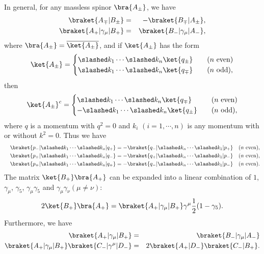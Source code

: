 In general, for any massless spinor $\bra{A_\pm}$, we have 
\begin{eqnarray}
\braket{A_\mp|B_\pm}&=&-\braket{B_\mp|A_\pm},\nonumber\\
\braket{A_+|\gamma_\mu|B_+}&=&\braket{B_-|\gamma_\mu|A_-},
\end{eqnarray}
where $\bra{A_\pm}=\overline{\ket{A_\pm}}$, and if $\ket{A_\pm}$ has the form
\begin{equation}
\ket{A_\pm}=
\begin{cases}
\slashed k_1\cdots\slashed k_n\ket{q_\pm}&\quad (n\text{ even})\\
\slashed k_1\cdots\slashed k_n\ket{q_\mp}&\quad (n\text{ odd}),
\end{cases}
\end{equation}
then
\begin{equation}
\ket{A_\pm}^c=
\begin{cases}
\slashed k_1\cdots\slashed k_n\ket{q_\mp}&\quad (n\text{ even})\\
-\slashed k_1\cdots\slashed k_n\ket{q_\pm}&\quad (n\text{ odd}),
\end{cases}
\end{equation}
where $q$ is a momentum with $q^2=0$ and $k_i$ $(i=1,\cdots,n)$ is any momentum with or without $k^2=0$. Thus we have 
\begin{eqnarray}
&&\braket{p_-|\slashed k_1\cdots\slashed k_n|q_+}=-\braket{q_-|\slashed k_n\cdots\slashed k_1|p_+} \quad (n\text{ even}), \nonumber\\
&&\braket{p_+|\slashed k_1\cdots\slashed k_n|q_-}=-\braket{q_+|\slashed k_n\cdots\slashed k_1|p_-} \quad (n\text{ even}), \nonumber\\
&&\braket{p_+|\slashed k_1\cdots\slashed k_n|q_+}=-\braket{q_-|\slashed k_n\cdots\slashed k_1|p_-} \quad (n\text{ even}).
\end{eqnarray}
The matrix $\ket{B_+}\bra{A_+}$ can be expanded into a linear combination of $1$, $\gamma_\mu$, $\gamma_5$, $\gamma_\mu\gamma_5$ and $\gamma_\mu\gamma_\nu(\mu\neq\nu)$:
\begin{equation}
2\ket{B_+}\bra{A_+}=\braket{A_+|\gamma_\mu|B_+}\gamma^\mu\frac{1}{2}(1-\gamma_5).
\end{equation}
Furthermore, we have
\begin{eqnarray}
\braket{A_+|\gamma_\mu|B_+}&=&\braket{B_-|\gamma_\mu|A_-}\nonumber\\
\braket{A_+|\gamma_\mu|B_+}\braket{C_-|\gamma^\mu|D_-}&=&2\braket{A_+|D_-}\braket{C_-|B_+}.
\end{eqnarray}

